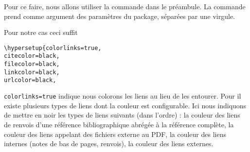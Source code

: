 Pour ce faire, nous allons utiliser la commande  dans le préambule. La commande prend comme argument des paramètres du package, séparées par une virgule.

Pour notre cas ceci suffit
\begin{verbatim}
\hypersetup{colorlinks=true,
citecolor=black,
filecolor=black,
linkcolor=black,
urlcolor=black,
\end{verbatim}

\verb|colorlinks=true| indique nous colorons les liens au lieu de les entourer. Pour  il existe plusieurs types de liens dont la couleur est configurable. Ici nous indiquons de mettre en noir les types de liens suivants (dans l'ordre) : la couleur des liens de renvois d'une référence bibliographique abrégée à la référence complète, la couleur des liens appelant des fichiers externe au PDF, la couleur des liens internes (notes de bas de pages, renvois), la couleur des liens externes.
